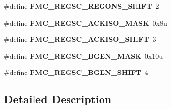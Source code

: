 \begin{DoxyCompactItemize}
\#define {\bfseries P\+M\+C\+\_\+\+R\+E\+G\+S\+C\+\_\+\+R\+E\+G\+O\+N\+S\+\_\+\+S\+H\+I\+FT}~2
\item 
\mbox{\label{group___p_m_c___register___masks_ga35ced6f0f133b2d5892bdcba3e0b2832}} 
\#define {\bfseries P\+M\+C\+\_\+\+R\+E\+G\+S\+C\+\_\+\+A\+C\+K\+I\+S\+O\+\_\+\+M\+A\+SK}~0x8u
\item 
\mbox{\label{group___p_m_c___register___masks_gad2b9b6ce6aa455e8607fd3c2d1647544}} 
\#define {\bfseries P\+M\+C\+\_\+\+R\+E\+G\+S\+C\+\_\+\+A\+C\+K\+I\+S\+O\+\_\+\+S\+H\+I\+FT}~3
\item 
\mbox{\label{group___p_m_c___register___masks_ga7e1520a56f4d2675018d5efaa9492f19}} 
\#define {\bfseries P\+M\+C\+\_\+\+R\+E\+G\+S\+C\+\_\+\+B\+G\+E\+N\+\_\+\+M\+A\+SK}~0x10u
\item 
\mbox{\label{group___p_m_c___register___masks_gab43d258e6864ee3a7a728de1d720f6fe}} 
\#define {\bfseries P\+M\+C\+\_\+\+R\+E\+G\+S\+C\+\_\+\+B\+G\+E\+N\+\_\+\+S\+H\+I\+FT}~4
\end{DoxyCompactItemize}


\subsection{Detailed Description}
